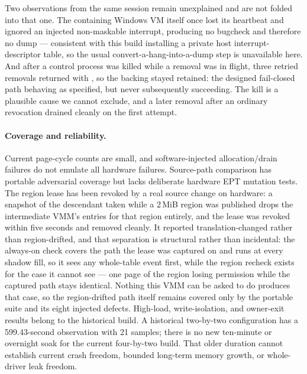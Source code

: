 Two observations from the same session remain unexplained and are not folded
into that one. The containing Windows VM itself once lost its heartbeat and
ignored an injected non-maskable interrupt, producing no bugcheck and therefore
no dump --- consistent with this build installing a private host
interrupt-descriptor table, so the usual convert-a-hang-into-a-dump step is
unavailable here. And after a control process was killed while a removal was in
flight, three retried removals returned 
with , so the backing stayed retained: the designed fail-closed
path behaving as specified, but never subsequently succeeding. The kill is a
plausible cause we cannot exclude, and a later removal after an ordinary
revocation drained cleanly on the first attempt.

\paragraph{Coverage and reliability.}
Current page-cycle counts are small, and software-injected allocation/drain
failures do not emulate all hardware failures. Source-path comparison has
portable adversarial coverage but lacks deliberate hardware EPT mutation tests.
The region lease has been revoked by a real source change on hardware: a
snapshot of the descendant taken while a 2\,MiB region was published drops the
intermediate VMM's entries for that region entirely, and the lease was revoked
within five seconds and removed cleanly. It reported translation-changed rather
than region-drifted, and that separation is structural rather than incidental:
the always-on check covers the path the lease was captured on and runs at every
shadow fill, so it sees any whole-table event first, while the region recheck
exists for the case it cannot see --- one page of the region losing permission
while the captured path stays identical. Nothing this VMM can be asked to do
produces that case, so the region-drifted path itself remains covered only by
the portable suite and its eight injected defects.
High-load, write-isolation, and owner-exit results belong to the historical
build. A historical two-by-two configuration has a 599.43-second observation
with 21 samples; there is no new ten-minute or overnight soak for the current
four-by-two build. That older duration cannot establish current crash freedom,
bounded long-term memory growth, or whole-driver leak freedom.

